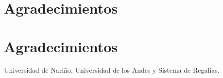 \documentclass[conference]{IEEEtran}
\begin{document}
  \section*{Agradecimientos}
\else
  \section*{Agradecimientos}
\fi

Universidad de Nariño, Universidad de los Andes y Sistema de Regalias.

\ifCLASSOPTIONcaptionsoff
  \newpage
\fi





\end{document}
